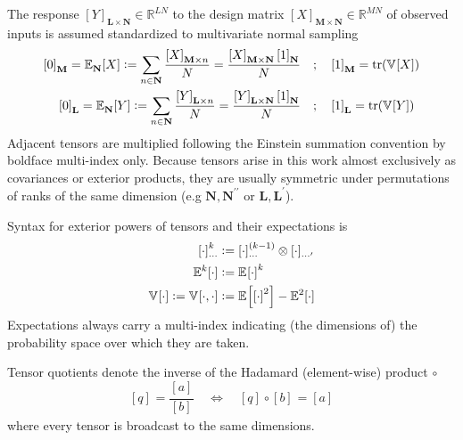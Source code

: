 \documentclass[preprint,12pt]{elsarticle}
\newcommand*{\M}[1]{\ensuremath{#1}\xspace}
\newcommand*{\x}{\times}
\newcommand*{\mi}[1]{\mathbf{#1}}
\newcommand*{\st}[1]{\mathbb{#1}}
\newcommand*{\te}[2][]{\left\lbrack{#2}\right\rbrack_{#1}}
\newcommand*{\deq}{\M{\mathrel{\mathop:}=}}
\newcommand{\T}[1]{\text{#1}}
\newcommand*{\QT}[2][]{\M{\quad\T{#2}\ifthenelse{\equal{#1}{}}{\quad}{#1}}}
\newcommand*{\ev}[3][]{\mathbb{E}_{#3}^{#1}\!\left\lbrack{#2}\right\rbrack}
\newcommand*{\cov}[3][]{\ifthenelse{\equal{#1}{}}{\mathbb{V}_{#3}\!\left\lbrack{#2}\right\rbrack}{\mathbb{V}_{#3}\!\left\lbrack{#2,#1}\right\rbrack}}
\DeclareMathOperator*{\trace}{tr\!}
\begin{document}
        The response $\te[\mi{L}\x\mi{N}]{Y}\in \st{R}^{LN}$ to the design matrix $\te[\mi{M}\x\mi{N}]{X}\in\st{R}^{MN}$ of observed inputs is assumed standardized to multivariate normal sampling
        \begin{equation*}
            \begin{aligned}
                \te[\mi{M}]{0} = \ev{X}{\mi{N}} 
                \deq \sum_{n \in \mi{N}} \frac{\te[\mi{M}\x n]{X}}{N}
                = \frac{\te[\mi{M}\x\mi{N}]{X} \te[\mi{N}]{1}}{N}
                &\QT{;} \te[\mi{M}]{1} = \trace\left(\cov{X}{}\right)
                \\
                \te[\mi{L}]{0} = \ev{Y}{\mi{N}}  
                \deq \sum_{n \in \mi{N}} \frac{\te[\mi{L} \times n]{Y}}{N}
                = \frac{\te[\mi{L}\x\mi{N}]{Y} \te[\mi{N}]{1}}{N}
                &\QT{;} \te[\mi{L}]{1} = \trace\left(\cov{Y}{}\right)
            \end{aligned}                
        \end{equation*}
        Adjacent tensors are multiplied following the Einstein summation convention by boldface multi-index only. 
        Because tensors arise in this work almost exclusively as covariances or exterior products, they are usually symmetric under permutations of ranks of the same dimension (e.g $\mi{N},\mi{N^{\prime\prime}}$ or $\mi{L},\mi{L^{\prime}}$).

        Syntax for exterior powers of tensors and their expectations is
        \begin{equation*}
            \begin{aligned}
                \te[\cdots]{\cdot}^k &\deq 
                \te[\cdots]{\cdot}^{(k-1)} \otimes \te[\cdots^{\prime}]{\cdot} \\
                \ev[k]{\cdot}{} &\deq \ev{\cdot}{}^{k} \\
                \cov{\cdot}{} \deq \cov[\cdot]{\cdot}{} &\deq \ev{\te{\cdot}^2}{} - \ev[2]{\cdot}{}
            \end{aligned}
        \end{equation*}
        Expectations always carry a multi-index indicating (the dimensions of) the probability space over which they are taken.

        Tensor quotients denote the inverse of the Hadamard (element-wise) product $\circ$
        \begin{equation*}
            \te{q} = \frac{\te{a}}{\te{b}} \quad \Longleftrightarrow \quad {\te{q}} \circ {\te{b}} = {\te{a}}
        \end{equation*}
        where every tensor is broadcast to the same dimensions.
\end{document}
